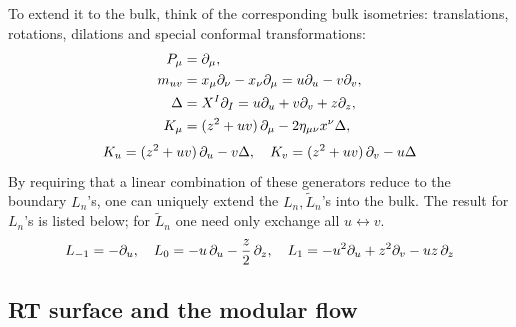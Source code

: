 \documentclass[11pt,a4paper,utf8]{article}
\begin{document}
	To extend it to the bulk, think of the corresponding bulk isometries: translations, rotations, dilations and special conformal transformations:
	\begin{equation}
	\begin{aligned}
		P_\mu
		&= \partial_{\mu},\\
		m_{uv}
		&= x_\mu \partial_{\nu} - x_\nu \partial_{\mu}
		= u\partial_{u} - v\partial_{v},\\
		\Delta
		&= X^I \partial_{I}
		= u\partial_{u} + v\partial_{v} + z\partial_{z},\\
		K_\mu
		&= (z^2 + uv)\,\partial_{\mu}
			- 2\eta_{\mu\nu} x^\nu \Delta,
	\end{aligned}
	\end{equation}
	\begin{equation}
		K_u = (z^2 + uv)\,\partial_{u} - v \Delta,
	\quad
		K_v = (z^2 + uv)\,\partial_{v} - u \Delta
	\end{equation}
	By requiring that a linear combination of these generators reduce to the boundary $L_n$'s, one can uniquely extend the $L_n,\tilde{L}_n$'s into the bulk. The result for $L_n$'s is listed below; for $\tilde{L}_n$ one need only exchange all $u\leftrightarrow v$.
	\begin{equation}
		L_{-1} = -\partial_{u},
	\quad
		L_0 = -u\,\partial_{u} - \frac{z}{2}\,\partial_{z},
	\quad
		L_1 = -u^2\partial_{u} + z^2 \partial_{v}
			- uz\,\partial_{z}
	\end{equation}

\subsection{RT surface and the modular flow}

\end{document}
